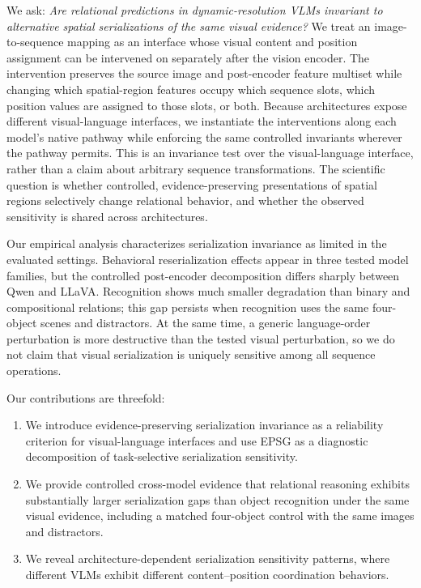\documentclass[10pt,twocolumn,letterpaper]{article}
\begin{document}
We ask: \emph{Are relational predictions in dynamic-resolution VLMs invariant to alternative spatial serializations of the same visual evidence?}
We treat an image-to-sequence mapping as an interface whose visual content and position assignment can be intervened on separately after the vision encoder.
The intervention preserves the source image and post-encoder feature multiset while changing which spatial-region features occupy which sequence slots, which position values are assigned to those slots, or both.
Because architectures expose different visual-language interfaces, we instantiate the interventions along each model's native pathway while enforcing the same controlled invariants wherever the pathway permits.
This is an invariance test over the visual-language interface, rather than a claim about arbitrary sequence transformations.
The scientific question is whether controlled, evidence-preserving presentations of spatial regions selectively change relational behavior, and whether the observed sensitivity is shared across architectures.

Our empirical analysis characterizes serialization invariance as limited in the evaluated settings.
Behavioral reserialization effects appear in three tested model families, but the controlled post-encoder decomposition differs sharply between Qwen and LLaVA.
Recognition shows much smaller degradation than binary and compositional relations; this gap persists when recognition uses the same four-object scenes and distractors.
At the same time, a generic language-order perturbation is more destructive than the tested visual perturbation, so we do not claim that visual serialization is uniquely sensitive among all sequence operations.

Our contributions are threefold:
\begin{enumerate}[leftmargin=*,itemsep=1pt,topsep=2pt]
    \item We introduce evidence-preserving serialization invariance as a reliability criterion for visual-language interfaces and use EPSG as a diagnostic decomposition of task-selective serialization sensitivity.
    \item We provide controlled cross-model evidence that relational reasoning exhibits substantially larger serialization gaps than object recognition under the same visual evidence, including a matched four-object control with the same images and distractors.
    \item We reveal architecture-dependent serialization sensitivity patterns, where different VLMs exhibit different content--position coordination behaviors.
\end{enumerate}
\end{document}

